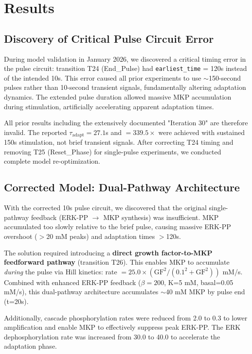 \documentclass[twocolumn,11pt]{article}
\newcommand{\erk}{ERK}
\newcommand{\mkp}{MKP}
\newcommand{\srr}{\text{SRR}}
\begin{document}
\section{Results}

\subsection{Discovery of Critical Pulse Circuit Error}

During model validation in January 2026, we discovered a critical timing error in the pulse circuit: transition T24 (End\_Pulse) had \texttt{earliest\_time} = 120s instead of the intended 10s. This error caused all prior experiments to use $\sim$150-second pulses rather than 10-second transient signals, fundamentally altering adaptation dynamics. The extended pulse duration allowed massive \mkp{} accumulation during stimulation, artificially accelerating apparent adaptation times.

All prior results including the extensively documented "Iteration 30" are therefore invalid. The reported $\tau_{\text{adapt}}=27.1$s and \srr{}$=339.5\times$ were achieved with sustained 150s stimulation, not brief transient signals. After correcting T24 timing and removing T25 (Reset\_Phase) for single-pulse experiments, we conducted complete model re-optimization.

\subsection{Corrected Model: Dual-Pathway Architecture}

With the corrected 10s pulse circuit, we discovered that the original single-pathway feedback (\erk{}-PP $\to$ \mkp{} synthesis) was insufficient. \mkp{} accumulated too slowly relative to the brief pulse, causing massive \erk{}-PP overshoot ($>$20 mM peaks) and adaptation times $>$120s.

The solution required introducing a \textbf{direct growth factor-to-\mkp{} feedforward pathway} (transition T26). This enables \mkp{} to accumulate \textit{during} the pulse via Hill kinetics: rate $= 25.0 \times (\text{GF}^2/(0.1^2 + \text{GF}^2))$ mM/s. Combined with enhanced \erk{}-PP feedback ($\beta=200$, K=5 mM, basal=0.05 mM/s), this dual-pathway architecture accumulates $\sim$40 mM \mkp{} by pulse end (t=20s).

Additionally, cascade phosphorylation rates were reduced from 2.0 to 0.3 to lower amplification and enable \mkp{} to effectively suppress peak \erk{}-PP. The \erk{} dephosphorylation rate was increased from 30.0 to 40.0 to accelerate the adaptation phase.
\end{document}
